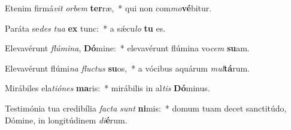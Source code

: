 \item Etenim firmá\textit{vit} \textit{or}\textit{bem} \textbf{ter}ræ,~* qui non com\textit{mo}\textbf{vé}bitur.
\item Paráta se\textit{des} \textit{tu}\textit{a} \textbf{ex} tunc:~* a sǽcu\textit{lo} \textbf{tu} es.
\item Elevavérunt \textit{flú}\textit{mi}\textit{na}, \textbf{Dó}mine:~* elevavérunt flúmina vo\textit{cem} \textbf{su}am.
\item Elevavérunt flúmi\textit{na} \textit{fluc}\textit{tus} \textbf{su}os,~* a vócibus aquárum \textit{mul}\textbf{tá}rum.
\item Mirábiles ela\textit{ti}\textit{ó}\textit{nes} \textbf{ma}ris:~* mirábilis in al\textit{tis} \textbf{Dó}minus.
\item Testimónia tua credibília \textit{fac}\textit{ta} \textit{sunt} \textbf{ni}mis:~* domum tuam decet sanctitúdo, Dómine, in longitúdinem \textit{di}\textbf{é}rum.
